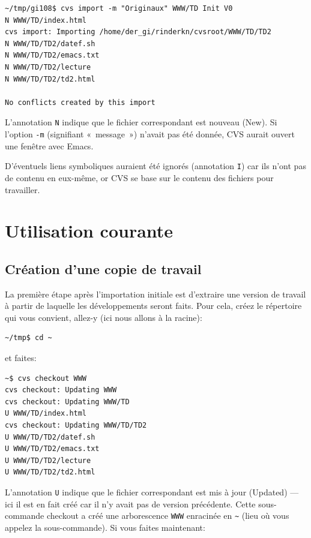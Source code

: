 \documentclass[11pt,a4paper]{article}
\begin{document}
{\small
\begin{verbatim}
~/tmp/gi108$ cvs import -m "Originaux" WWW/TD Init V0
N WWW/TD/index.html
cvs import: Importing /home/der_gi/rinderkn/cvsroot/WWW/TD/TD2
N WWW/TD/TD2/datef.sh
N WWW/TD/TD2/emacs.txt
N WWW/TD/TD2/lecture
N WWW/TD/TD2/td2.html

No conflicts created by this import
\end{verbatim}
}

L'annotation \texttt{N} indique que le fichier correspondant est
nouveau (\textsf{New}). Si l'option \texttt{-m} (signifiant
«~message~») n'avait pas été donnée, CVS aurait ouvert une fenêtre
avec Emacs.

\bigskip

D'éventuels liens symboliques auraient été ignorés (annotation
\texttt{I}) car ils n'ont pas de contenu en eux-même, or CVS se base
sur le contenu des fichiers pour travailler.

\section{Utilisation courante}

\subsection{Création d'une copie de travail}

La première étape après l'importation initiale est d'extraire une
version de travail à partir de laquelle les développements seront
faits. Pour cela, créez le répertoire qui vous convient, allez-y (ici
nous allons à la racine):

{\small
\begin{verbatim}
~/tmp$ cd ~
\end{verbatim}
}

\noindent
et faites:

{\small
\begin{verbatim}
~$ cvs checkout WWW
cvs checkout: Updating WWW
cvs checkout: Updating WWW/TD
U WWW/TD/index.html
cvs checkout: Updating WWW/TD/TD2
U WWW/TD/TD2/datef.sh
U WWW/TD/TD2/emacs.txt
U WWW/TD/TD2/lecture
U WWW/TD/TD2/td2.html
\end{verbatim}
}

\noindent
L'annotation \texttt{U} indique que le fichier correspondant est mis à
jour (\textsf{Updated}) --- ici il est en fait créé car il n'y avait
pas de version précédente. Cette sous-commande \textsf{checkout} a
créé une arborescence \texttt{WWW} enracinée en \verb|~| (lieu où vous
appelez la sous-commande). Si vous faites maintenant:
\end{document}
